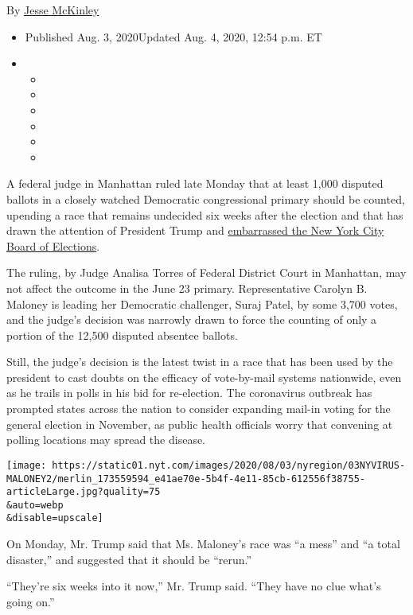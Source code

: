 By \href{https://www.nytimes.com/by/jesse-mckinley}{Jesse McKinley}

\begin{itemize}
\item
  Published Aug. 3, 2020Updated Aug. 4, 2020, 12:54 p.m. ET
\item
  \begin{itemize}
  \item
  \item
  \item
  \item
  \item
  \item
  \end{itemize}
\end{itemize}

A federal judge in Manhattan ruled late Monday that at least 1,000
disputed ballots in a closely watched Democratic congressional primary
should be counted, upending a race that remains undecided six weeks
after the election and that has drawn the attention of President Trump
and
\href{https://www.nytimes.com/2020/08/03/nyregion/nyc-mail-ballots-voting.html}{embarrassed
the New York City Board of Elections}.

The ruling, by Judge Analisa Torres of Federal District Court in
Manhattan, may not affect the outcome in the June 23 primary.
Representative Carolyn B. Maloney is leading her Democratic challenger,
Suraj Patel, by some 3,700 votes, and the judge's decision was narrowly
drawn to force the counting of only a portion of the 12,500 disputed
absentee ballots.

Still, the judge's decision is the latest twist in a race that has been
used by the president to cast doubts on the efficacy of vote-by-mail
systems nationwide, even as he trails in polls in his bid for
re-election. The coronavirus outbreak has prompted states across the
nation to consider expanding mail-in voting for the general election in
November, as public health officials worry that convening at polling
locations may spread the disease.

\texttt{[image: https://static01.nyt.com/images/2020/08/03/nyregion/03NYVIRUS-MALONEY2/merlin\_173559594\_e41ae70e-5b4f-4e11-85cb-612556f38755-articleLarge.jpg?quality=75\\\&auto=webp\\\&disable=upscale]}

On Monday, Mr. Trump said that Ms. Maloney's race was ``a mess'' and ``a
total disaster,'' and suggested that it should be ``rerun.''

``They're six weeks into it now,'' Mr. Trump said. ``They have no clue
what's going on.''

